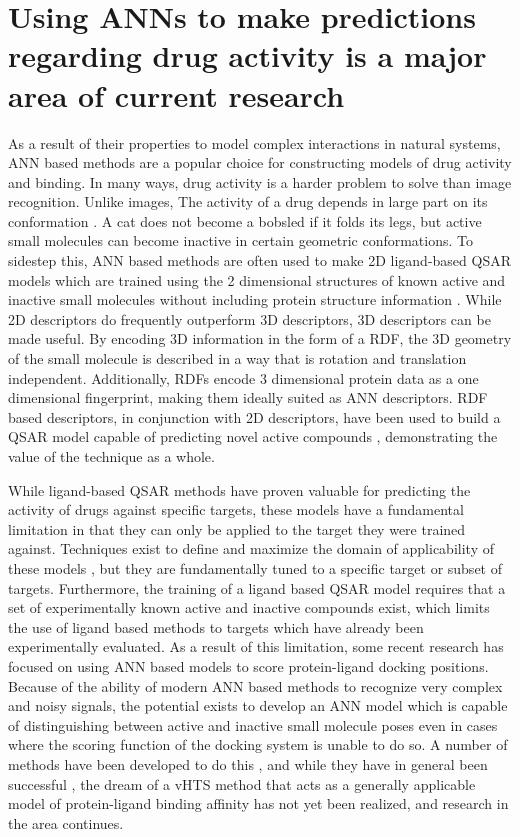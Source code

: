 \section{Using \acs{ANN}s to make predictions regarding drug activity is a major area of current research}

As a result of their properties to model complex interactions in natural systems, \ac{ANN} based methods are a popular choice for constructing models of drug activity and binding.
In many ways, drug activity is a harder problem to solve than image recognition.
Unlike images, The activity of a drug depends in large part on its conformation \citep{Nicklaus:1995tu}.
A cat does not become a bobsled if it folds its legs, but active small molecules can become inactive in certain geometric conformations.
To sidestep this, \ac{ANN} based methods are often used to make 2D ligand-based \ac{QSAR} models which are trained using the 2 dimensional structures of known active and inactive small molecules without including protein structure information \citep{Myint:2012ts}.
While 2D descriptors do frequently outperform 3D descriptors, 3D descriptors can be made useful.
By encoding 3D information in the form of a \ac{RDF}, the 3D geometry of the small molecule is described in a way that is rotation and translation independent.
Additionally, \ac{RDF}s encode 3 dimensional protein data as a one dimensional fingerprint, making them ideally suited as \ac{ANN} descriptors.
\ac{RDF} based descriptors, in conjunction with 2D descriptors, have been used to build a \ac{QSAR} model capable of predicting novel active compounds \citep{Mueller:2010dx}, demonstrating the value of the technique as a whole.

While ligand-based \ac{QSAR} methods have proven valuable for predicting the activity of drugs against specific targets, these models have a fundamental limitation in that they can only be applied to the target they were trained against.
Techniques exist to define and maximize the domain of applicability of these models \citep{Sahigara:2012kb}, but they are fundamentally tuned to a specific target or subset of targets.
Furthermore, the training of a ligand based \ac{QSAR} model requires that a set of experimentally known active and inactive compounds exist, which limits the use of ligand based methods to targets which have already been experimentally evaluated.
As a result of this limitation, some recent research has focused on using \ac{ANN} based models to score protein-ligand docking positions.
Because of the ability of modern \ac{ANN} based methods to recognize very complex and noisy signals, the potential exists to develop an \ac{ANN} model which is capable of distinguishing between active and inactive small molecule poses even in cases where the scoring function of the docking system is unable to do so.
A number of methods have been developed to do this \citep{Durrant:2013db}, and while they have in general been successful \citep{Durrant:2011dx}, the dream of a \ac{vHTS} method that acts as a generally applicable model of protein-ligand binding affinity has not yet been realized, and research in the area continues.


